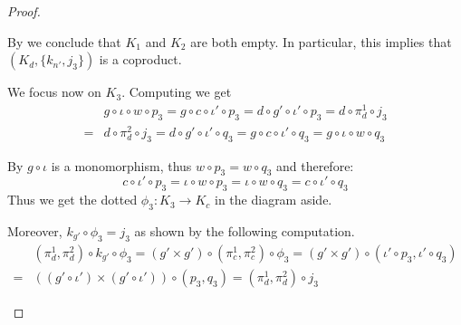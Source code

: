 \documentclass[a4paper,UKenglish,cleveref,pdftex,thm-restate,numberwithinsect]{lipics-v2021}
\def\E{\textbf {\textup{E}}}
\newcommand{\commentato}[1]{ {} }
\newcommand{\id}[1]{\mathsf{id}_{#1}}
\begin{document}
\begin{proof}
\begin{enumerate}
By  we conclude that $K_1$ and $K_2$
are both empty. In particular, this implies that $(K_d, \{k_{n'}, j_3\})$ is a coproduct.


We focus now on $K_3$. Computing we get
	\begin{align*}
	&g\circ \iota \circ w\circ p_3=g\circ c\circ \iota'\circ p_3=d\circ g'\circ \iota'\circ p_3=d\circ \pi^1_d\circ j_3\\=&d\circ \pi^2_d\circ j_3=d\circ g'\circ \iota' \circ q_3=g\circ c\circ \iota'\circ q_3=g\circ \iota \circ w\circ q_3
	\end{align*}

\noindent 
\parbox{3cm}{}\hfill\parbox{9.5cm}{By  $g\circ \iota$ is a monomorphism, thus $w\circ p_3=w\circ q_3$ and therefore:
\[c\circ \iota'\circ p_3=\iota\circ w\circ p_3=\iota \circ w\circ q_3=c\circ \iota'\circ q_3\]
Thus we get the dotted $\phi_3\colon K_3\to K_c$ in the diagram aside.}

Moreover, $k_{g'}\circ \phi_3=j_3$ as shown by the following computation.
\begin{align*}
&(\pi^1_d, \pi^2_d)\circ k_{g'}\circ \phi_3=(g'\times g')\circ (\pi^1_c, \pi^2_c)\circ \phi_3=(g'\times g')\circ (\iota'\circ p_3, \iota'\circ q_3)\\=&((g'\circ \iota') \times (g'\circ \iota'))\circ (p_3, q_3)=(\pi^1_d, \pi^2_d)\circ j_3
\end{align*}



 
 \commentato{ 
 
 	\smallskip
 \parbox{7.5cm}{We can go further. The outer part of the diagram on the right commutes, so that we have the dotted $\psi_0\circ K_b\to K_0$.
 Now, on the one hand $\phi_0\circ \psi_0=\id{K_b}$ because if we compute we get:
  \[(\pi^1_b, \pi^2_b)\circ \phi_0\circ \psi_0=(p_0, q_0)\circ \psi_0=(\pi^1_b, \pi^2_b)\]}\hfill \parbox{4cm}{\vspace{-.5cm}\xymatrix{K_b \ar[dr]_{(\pi^1_b, \pi^2_b)}  \ar@{>->}@/^.4cm/[rr]^{k_{n'}} \ar@{.>}[r]_{\psi_0}& K_0 \ar@{>->}[r]_{j_0}  \ar[d]^{(p_0, q_0)}& K_d   \ar[d]^{(\pi^1_d, \pi^2_d)} \\
 	& B'\times B' \ar@{>->}[r]_-{n'\times n'} & D'\times D' }
 	}

}
\end{enumerate}
\end{proof}
\end{document}
